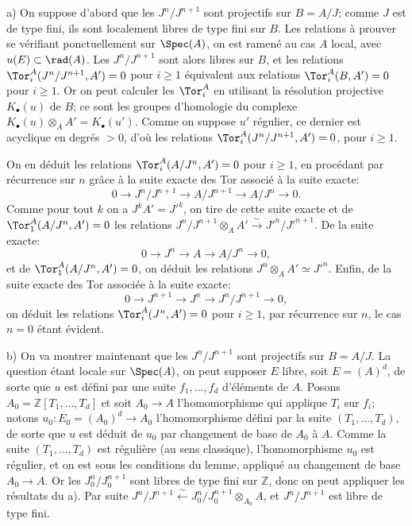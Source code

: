 a) On suppose d'abord que les $J^n/J^{n+1}$ sont projectifs sur $B=A/J$; comme $J$ est de type fini, ils sont localement libres de type fini sur $B$.
Les relations à prouver se vérifiant ponctuellement sur $\Spec(A)$, on est ramené au cas $A$ local, avec $u(E)\subset\rad(A)$. Les $J^n/J^{n+1}$ sont alors libres sur $B$, et les relations $\Tor_i^A(J^n/J^{n+1},A')=0$ pour $i\geq1$ équivalent aux relations $\Tor_i^A(B,A')=0$ pour $i\geq1$. Or on peut calculer les $\Tor_i^A$ en utilisant la résolution projective $K_\bullet(u)$ de $B$; ce sont les groupes d'homologie du complexe $K_\bullet(u)\otimes_AA'=K_\bullet(u')$. Comme on suppose $u'$ régulier, ce dernier est acyclique en degrés $>0$, d'où les relations $\Tor_i^A(J^n/J^{n+1},A')=0$, pour $i\geq1$.

On en déduit les relations $\Tor_i^A(A/J^n,A')=0$ pour $i\geq1$, en procédant par récurrence sur $n$ grâce à la suite exacte des Tor associé à la suite exacte:
\[
 0\longrightarrow J^n/J^{n+1}\longrightarrow A/J^{n+1}\longrightarrow A/J^n\longrightarrow0.
\]
Comme pour tout $k$ on a $J^kA'=J'^k$, on tire de cette suite exacte et de $\Tor_1^A(A/J^n,A')=0$ les relations $J^n/J^{n+1}\otimes_AA'\xrightarrow{\sim}J'^n/J'^{n+1}$. De la suite exacte:
\[
 0\longrightarrow J^n\longrightarrow A\longrightarrow A/J^n\longrightarrow0,
\]
et de $\Tor_1^A(A/J^n,A')=0$, on déduit les relations $J^n\otimes_AA'\simeq J'^n$. Enfin, de la suite exacte des Tor associée à la suite exacte:
\[
 0\longrightarrow J^{n+1}\longrightarrow J^n\longrightarrow J^n/J^{n+1}\longrightarrow0,
\]
on déduit les relations $\Tor_i^A(J^n,A')=0$ pour $i\geq1$, par récurrence sur $n$, le cas $n=0$ étant évident.

b) On va montrer maintenant que les $J^n/J^{n+1}$ sont projectifs sur $B=A/J$. La question étant locale sur $\Spec(A)$, on peut supposer $E$ libre, soit $E=(A)^d$, de sorte que $u$ est défini par une suite $f_1,\ldots,f_d$ d'éléments de $A$. Posons $A_0=\mathbb Z[T_1,\ldots,T_d]$ et soit $A_0\longrightarrow A$ l'homomorphisme qui applique
$T_i$ sur $f_i$; notons $u_0:E_0=(A_0)^d\longrightarrow A_0$ l'homomorphisme défini par la suite $(T_1,\ldots,T_d)$, de sorte que $u$ est déduit de $u_0$ par changement de base de $A_0$ à $A$. Comme la suite $(T_1,\ldots,T_d)$ est régulière (au sens classique), l'homomorphisme $u_0$ est régulier, et on est sous les conditions du lemme, appliqué au changement de base $A_0\longrightarrow A$. Or les $J_0^n/J_0^{n+1}$ sont libres de type fini sur $\mathbb Z$, donc on peut appliquer les résultats du a). Par suite $J^n/J^{n+1}\xleftarrow{\sim}J_0^n/J_0^{n+1}\otimes_{A_0}A$, et $J^n/J^{n+1}$ est libre de type fini.

